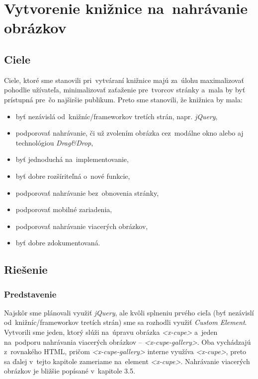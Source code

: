 \chapter{Vytvorenie knižnice na~nahrávanie obrázkov}
\label{sec:solution}

\section{Ciele}
\label{sec:goals}

Ciele, ktoré sme stanovili pri~vytváraní knižnice majú za~úlohu maximalizovať pohodlie užívateľa, minimalizovať zaťaženie pre~tvorcov stránky a~mala by byť prístupná pre~čo najširšie publikum. Preto sme stanovili, že knižnica by mala:

\begin{itemize}
	\item byť nezávislá od~knižníc/frameworkov tretích strán, napr. \emph{jQuery},
	\item podporovať nahrávanie, či už zvolením obrázka cez~modálne okno alebo aj technológiou \emph{Drag\&Drop}, 
	\item byť jednoduchá na~implementovanie,
	\item byť dobre rozšíriteľná o~nové funkcie,
	\item podporovať nahrávanie bez~obnovenia stránky,
	\item podporovať mobilné zariadenia,
	\item podporovať nahrávanie viacerých obrázkov,
	\item byť dobre zdokumentovaná.
\end{itemize}


\section{Riešenie}
\subsection{Predstavenie}
\label{sec:predstavenie-riesenia}
Najskôr sme plánovali využiť \emph{jQuery}, ale kvôli splneniu prvého cieľa (byť nezávislí od~knižníc/frameworkov tretích strán) sme sa rozhodli využiť \emph{Custom Element}. Vytvorili sme jeden, ktorý slúži na~úpravu obrázka \emph{<x-cupe>} a~jeden na~podporu nahrávania viacerých obrázkov -- \emph{<x-cupe-gallery>}. Oba vychádzajú z~rovnakého HTML, pričom \emph{<x-cupe-gallery>} interne využíva \emph{<x-cupe>}, preto sa ďalej v~tejto kapitole zameriame na~element \emph{<x-cupe>}. Nahrávanie viacerých obrázkov je bližšie popísané v~kapitole 3.5.



